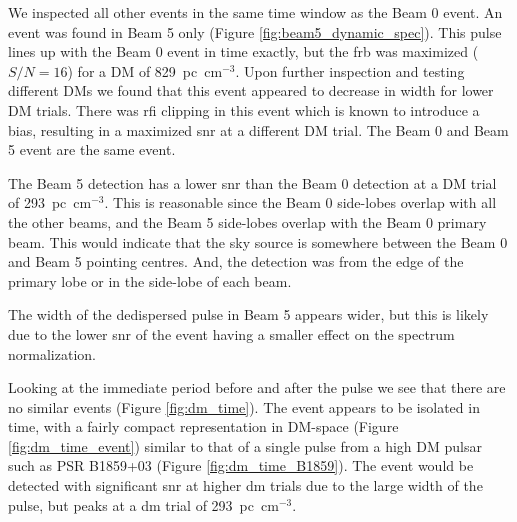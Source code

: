 \documentclass[a4paper,fleqn,usenatbib]{mnras}
\begin{document}
We inspected all other events in the same time window as the Beam 0 event. An
event was found in Beam 5 only (Figure \ref{fig:beam5_dynamic_spec}). This pulse
lines up with the Beam 0 event in time exactly, but the \gls{frb} was maximized
($S/N=16$) for a DM of 829~pc~cm$^{-3}$. Upon further inspection and testing
different DMs we found that this event appeared to decrease in width for lower
DM trials. There was \gls{rfi} clipping in this event which is known to
introduce a bias, resulting in a maximized \gls{snr} at a different DM trial.
The Beam 0 and Beam 5 event are the same event.

The Beam 5 detection has a lower \gls{snr} than the Beam 0 detection at a DM
trial of 293~pc~cm$^{-3}$. This is reasonable since the Beam 0 side-lobes
overlap with all the other beams, and the Beam 5 side-lobes overlap with the
Beam 0 primary beam. This would indicate that the sky source is somewhere
between the Beam 0 and Beam 5 pointing centres. And, the detection was from the
edge of the primary lobe or in the side-lobe of each beam.

The width of the dedispersed pulse in Beam 5 appears wider, but this is likely
due to the lower \gls{snr} of the event having a smaller effect on the spectrum
normalization.

Looking at the immediate period before and after the pulse we see that there are
no similar events (Figure \ref{fig:dm_time}). The event appears to be isolated
in time, with a fairly compact representation in DM-space (Figure
\ref{fig:dm_time_event}) similar to that of a single pulse from a high DM pulsar
such as PSR B1859+03 (Figure \ref{fig:dm_time_B1859}). The event would be
detected with significant \gls{snr} at higher \gls{dm} trials due to the large
width of the pulse, but peaks at a \gls{dm} trial of 293~pc~cm$^{-3}$.
\end{document}

